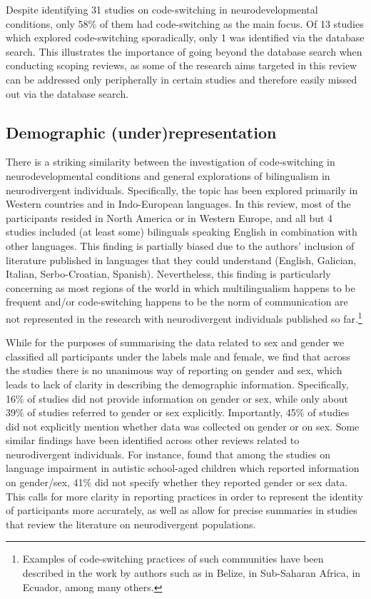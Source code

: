 \documentclass[output=paper]{langscibook}
\begin{document}
Despite identifying 31 studies on code-switching in neurodevelopmental conditions, only 58\% of them had code-switching as the main focus. Of 13 studies which explored code-switching sporadically, only 1 was identified via the database search. This illustrates the importance of going beyond the database search when conducting scoping reviews, as some of the research aims targeted in this review can be addressed only peripherally in certain studies and therefore easily missed out via the database search.

\subsection{Demographic (under)representation}

There is a striking similarity between the investigation of code-switching in neurodevelopmental conditions and general explorations of bilingualism in neurodivergent individuals. Specifically, the topic has been explored primarily in Western countries and in Indo-European languages. In this review, most of the participants resided in North America or in Western Europe, and all but 4 studies included (at least some) bilinguals speaking English in combination with other languages. This finding is partially biased due to the authors’ inclusion of literature published in languages that they could understand (English, Galician, Italian, Serbo-Croatian, Spanish). Nevertheless, this finding is particularly concerning as most regions of the world in which multilingualism happens to be frequent and/or code-switching happens to be the norm of communication are not represented in the research with neurodivergent individuals published so far.\footnote{Examples of code-switching practices of such communities have been described in the work by authors such as \citet{BalamDePradaPérez2016} in Belize, \citet{Aboh2020} in Sub-Saharan Africa, \citet{Lipski2017} in Ecuador, among many others.}

While for the purposes of summarising the data related to sex and gender we classified all participants under the labels male and female, we find that across the studies there is no unanimous way of reporting on gender and sex, which leads to lack of clarity in describing the demographic information. Specifically, 16\% of studies did not provide information on gender or sex, while only about 39\% of studies referred to gender or sex explicitly. Importantly, 45\% of studies did not explicitly mention whether data was collected on gender or on sex. Some similar findings have been identified across other reviews related to neurodivergent individuals. For instance, \citet{GirolamoEtAl2023studies} found that among the studies on language impairment in autistic school-aged children which reported information on gender/sex, 41\% did not specify whether they reported gender or sex data. This calls for more clarity in reporting practices in order to represent the identity of participants more accurately, as well as allow for precise summaries in studies that review the literature on neurodivergent populations.
\end{document}
